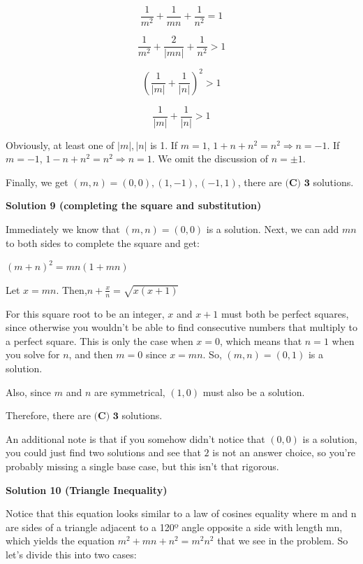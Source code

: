 \begin{enumerate}
 \[\frac{1}{m^2} + \frac{1}{mn} + \frac{1}{n^2} = 1\]

 \[\frac{1}{m^2} + \frac{2}{|mn|} + \frac{1}{n^2} > 1\]

 \[\left(\frac{1}{|m|} + \frac{1}{|n|}\right)^2 > 1\]

 \[\frac{1}{|m|} + \frac{1}{|n|} > 1\]

 Obviously, at least one of $|m|, |n|$ is 1. If $m = 1$, $1 + n + n^2 = n^2 \Rightarrow n = -1$. If $m = -1$, $1 - n + n^2 = n^2 \Rightarrow n = 1$. We omit the discussion of $n = \pm 1$.

 Finally, we get $(m, n) = (0, 0), (1, -1), (-1, 1)$, there are $\boxed{\textbf{(C) 3}}$ solutions.

 


 



\textbf{Solution 9 (completing the square and substitution)}

Immediately we know that $(m, n) = (0, 0)$ is a solution. Next, we can add $mn$ to both sides to complete the square and get:

 $(m+n)^2 = mn(1+mn)$

 Let $x = mn$. Then,$n + \frac{x}{n} = \sqrt{x(x+1)}$

 For this square root to be an integer, $x$ and $x+1$ must both be perfect squares, since otherwise you wouldn't be able to find consecutive numbers that multiply to a perfect square. This is only the case when $x = 0$, which means that $n = 1$ when you solve for $n$, and then $m = 0$ since $x = mn$. So, $(m, n) = (0, 1)$ is a solution.

 Also, since $m$ and $n$ are symmetrical, $(1, 0)$ must also be a solution.

 Therefore, there are $\boxed{\textbf{(C) 3}}$ solutions.

 An additional note is that if you somehow didn't notice that $(0, 0)$ is a solution, you could just find two solutions and see that $2$ is not an answer choice, so you're probably missing a single base case, but this isn't that rigorous.

 



\textbf{Solution 10 (Triangle Inequality)}

Notice that this equation looks similar to a law of cosines equality where m and n are sides of a triangle adjacent to a 120º angle opposite a side with length mn, which yields the equation $m^2 + mn + n^2 = m^2n^2$ that we see in the problem. So let's divide this into two cases:


\end{enumerate}
